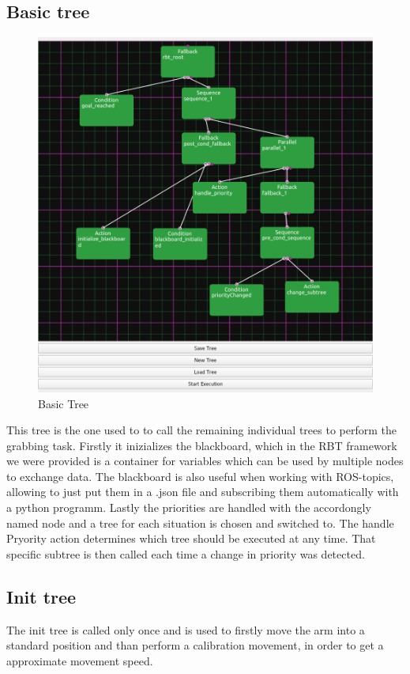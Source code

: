 \documentclass[report]{iisthesis}
\begin{document}
\subsection{Basic tree}
\begin{figure}[h]
    \caption{Basic Tree}
    \includegraphics[scale=0.2]{basicTree.png}
\end{figure}
This tree is the one used to to call the remaining individual trees to perform the grabbing task. Firstly it inizializes the blackboard, which in the RBT framework we were provided
is a container for variables which can be used by multiple nodes to exchange data. The blackboard is also useful when working with ROS-topics, allowing to just put them in a .json file and subscribing them automatically with a python programm.
Lastly the priorities are handled with the accordongly named node and a tree for each situation is chosen and switched to.
The handle Pryority action determines which tree should be executed at any time. That specific subtree is then called each time a change in priority was detected. 

\subsection{Init tree}
The init tree is called only once and is used to firstly move the arm into a standard position and than perform a calibration movement, in order to get a approximate movement speed. 
\end{document}
